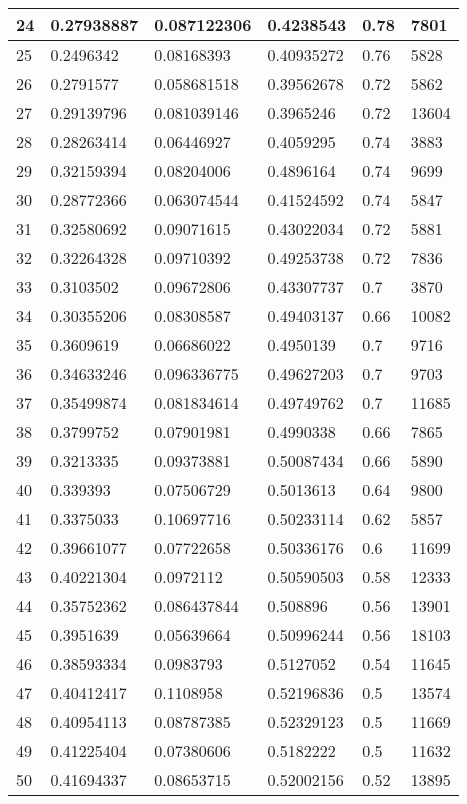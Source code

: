 \begin{longtable}{|l|l|l|l|l|l|}
24 & 0.27938887 & 0.087122306 & 0.4238543 & 0.78 & 7801 \\ \hline 
25 & 0.2496342 & 0.08168393 & 0.40935272 & 0.76 & 5828 \\ \hline 
26 & 0.2791577 & 0.058681518 & 0.39562678 & 0.72 & 5862 \\ \hline 
27 & 0.29139796 & 0.081039146 & 0.3965246 & 0.72 & 13604 \\ \hline 
28 & 0.28263414 & 0.06446927 & 0.4059295 & 0.74 & 3883 \\ \hline 
29 & 0.32159394 & 0.08204006 & 0.4896164 & 0.74 & 9699 \\ \hline 
30 & 0.28772366 & 0.063074544 & 0.41524592 & 0.74 & 5847 \\ \hline 
31 & 0.32580692 & 0.09071615 & 0.43022034 & 0.72 & 5881 \\ \hline 
32 & 0.32264328 & 0.09710392 & 0.49253738 & 0.72 & 7836 \\ \hline 
33 & 0.3103502 & 0.09672806 & 0.43307737 & 0.7 & 3870 \\ \hline 
34 & 0.30355206 & 0.08308587 & 0.49403137 & 0.66 & 10082 \\ \hline 
35 & 0.3609619 & 0.06686022 & 0.4950139 & 0.7 & 9716 \\ \hline 
36 & 0.34633246 & 0.096336775 & 0.49627203 & 0.7 & 9703 \\ \hline 
37 & 0.35499874 & 0.081834614 & 0.49749762 & 0.7 & 11685 \\ \hline 
38 & 0.3799752 & 0.07901981 & 0.4990338 & 0.66 & 7865 \\ \hline 
39 & 0.3213335 & 0.09373881 & 0.50087434 & 0.66 & 5890 \\ \hline 
40 & 0.339393 & 0.07506729 & 0.5013613 & 0.64 & 9800 \\ \hline 
41 & 0.3375033 & 0.10697716 & 0.50233114 & 0.62 & 5857 \\ \hline 
42 & 0.39661077 & 0.07722658 & 0.50336176 & 0.6 & 11699 \\ \hline 
43 & 0.40221304 & 0.0972112 & 0.50590503 & 0.58 & 12333 \\ \hline 
44 & 0.35752362 & 0.086437844 & 0.508896 & 0.56 & 13901 \\ \hline 
45 & 0.3951639 & 0.05639664 & 0.50996244 & 0.56 & 18103 \\ \hline 
46 & 0.38593334 & 0.0983793 & 0.5127052 & 0.54 & 11645 \\ \hline 
47 & 0.40412417 & 0.1108958 & 0.52196836 & 0.5 & 13574 \\ \hline 
48 & 0.40954113 & 0.08787385 & 0.52329123 & 0.5 & 11669 \\ \hline 
49 & 0.41225404 & 0.07380606 & 0.5182222 & 0.5 & 11632 \\ \hline 
50 & 0.41694337 & 0.08653715 & 0.52002156 & 0.52 & 13895 \\ \hline 
\end{longtable}